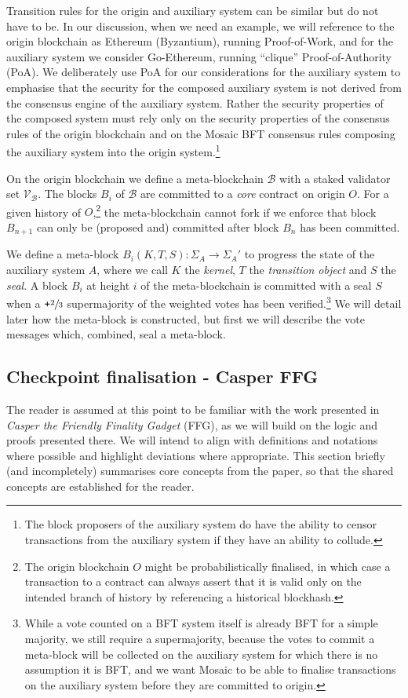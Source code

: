 \documentclass[12pt,a4paper]{article}
\begin{document}
Transition rules for the origin and auxiliary system can be similar but do not have to be.
In our discussion, when we need an example, we will reference to the origin blockchain as Ethereum (Byzantium), running Proof-of-Work, and for the auxiliary system we consider Go-Ethereum, running ``clique'' Proof-of-Authority (PoA).
We deliberately use PoA for our considerations for the auxiliary system to emphasise that the security for the composed auxiliary system is not derived from the consensus engine of the auxiliary system.
Rather the security properties of the composed system must rely only on the security properties of the consensus rules of the origin blockchain and on the Mosaic BFT consensus rules composing the auxiliary system into the origin system.\footnote{
	The block proposers of the auxiliary system do have the ability to censor transactions from the auxiliary system if they have an ability to collude.
}


On the origin blockchain we define a meta-blockchain $\mathcal{B}$ with a staked validator set $\mathcal{V}_\mathcal{B}$. The blocks $B_i$ of $\mathcal{B}$ are committed to a \emph{core} contract on origin $O$.
For a given history of $O$,\footnote{
	The origin blockchain $O$ might be probabilistically finalised, in which case a transaction to a contract can always assert that it is valid only on the intended branch of history by referencing a historical blockhash.
}
the meta-blockchain cannot fork if we enforce that block $B_{n+1}$ can only be (proposed and) committed after block $B_n$ has been committed.

We define a meta-block $B_i(K, T, S): \Sigma_A \rightarrow \Sigma_A'$ to progress the state of the auxiliary system $A$, where we call $K$ the \emph{kernel}, $T$ the \emph{transition object} and $S$ the \emph{seal}.
A block $B_i$ at height $i$ of the meta-blockchain is committed with a seal $S$ when a $\texttt{+}\sfrac{2}{3}$ supermajority of the weighted votes has been verified.\footnote{
	While a vote counted on a BFT system itself is already BFT for a simple majority, %
	we still require a supermajority, because the votes to commit a meta-block will be collected on the auxiliary system for which there is no assumption it is BFT, and we want Mosaic to be able to finalise transactions on the auxiliary system before they are committed to origin.
}
We will detail later how the meta-block is constructed, but first we will describe the vote messages which, combined, seal a meta-block.

\subsection{Checkpoint finalisation - Casper FFG}
The reader is assumed at this point to be familiar with the work presented in \textit{Casper the Friendly Finality Gadget}\cite{casperffg} (FFG), as we will build on the logic and proofs presented there.
We will intend to align with definitions and notations where possible and highlight deviations where appropriate.
This section briefly (and incompletely) summarises core concepts from the paper, so that the shared concepts are established for the reader.
\end{document}
